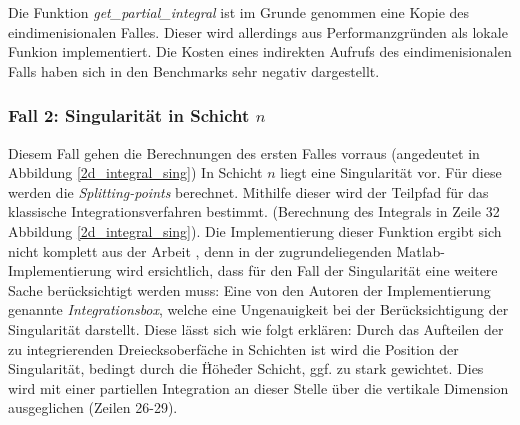 Die Funktion \textit{get\_partial\_integral} ist im Grunde genommen eine Kopie des eindimenisionalen Falles. Dieser wird allerdings aus Performanzgründen als lokale Funkion implementiert.
Die Kosten eines indirekten Aufrufs des eindimenisionalen Falls haben sich in den Benchmarks sehr negativ dargestellt.


\subsubsection*{Fall 2: Singularität in Schicht $n$}

Diesem Fall gehen die Berechnungen des ersten Falles vorraus (angedeutet in Abbildung \ref{2d_integral_sing})
In Schicht $n$ liegt eine Singularität vor. Für diese werden die \textit{Splitting-points} berechnet. Mithilfe dieser wird der Teilpfad für das klassische Integrationsverfahren bestimmt.
(Berechnung des Integrals in Zeile 32 Abbildung \ref{2d_integral_sing}).
Die Implementierung dieser Funktion ergibt sich nicht komplett aus der Arbeit \cite{gasperini:hal-03209144}, denn in der zugrundeliegenden Matlab-Implementierung wird ersichtlich, dass für den Fall der Singularität 
eine weitere Sache berücksichtigt werden muss: Eine von den Autoren der Implementierung genannte \textit{Integrationsbox}, welche eine Ungenauigkeit bei der Berücksichtigung der Singularität darstellt.
Diese lässt sich wie folgt erklären: Durch das Aufteilen der zu integrierenden Dreiecksoberfäche in Schichten ist wird die Position der Singularität, bedingt durch die \"Höhe\" der Schicht, ggf. zu stark gewichtet.
Dies wird mit einer partiellen Integration an dieser Stelle über die vertikale Dimension ausgeglichen (Zeilen 26-29).

\begin{center}
    
    \label{2d_integral_sing}
\end{center}
